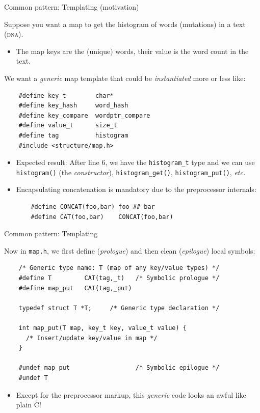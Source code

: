 \begin{frame}[fragile]{Common pattern: Templating (motivation)}

  Suppose you want a map to get the histogram of words (mutations) in a text (\textsc{dna}).
  \begin{itemize}
  \item The map keys are the (unique) words, their value is the word count in the text.
  \end{itemize}

  We want a {\em generic} map template that could be {\em instantiated} more or less like:
  \begin{lstlisting}
    #define key_t        char*
    #define key_hash     word_hash
    #define key_compare  wordptr_compare
    #define value_t      size_t
    #define tag          histogram
    #include <structure/map.h>
  \end{lstlisting}

  \begin{itemize}
  \item Expected result: After line 6, we have the \lstinline{histogram_t} type and we can use \lstinline{histogram()} (the {\em constructor}), \lstinline{histogram_get()}, \lstinline{histogram_put()}, {\em etc.}
  
  \item Encapsulating concatenation is mandatory due to the preprocessor internals:
  \begin{lstlisting}
    #define CONCAT(foo,bar) foo ## bar
    #define CAT(foo,bar)    CONCAT(foo,bar)
  \end{lstlisting}
\end{itemize}

\end{frame}

\begin{frame}[fragile]{Common pattern: Templating}

  Now in \lstinline{map.h}, we first define ({\em prologue}) and then clean ({\em epilogue}) local symbols:

  \begin{lstlisting}
    /* Generic type name: T (map of any key/value types) */
    #define T         CAT(tag,_t)   /* Symbolic prologue */
    #define map_put   CAT(tag,_put)

    typedef struct T *T;     /* Generic type declaration */

    int map_put(T map, key_t key, value_t value) {
      /* Insert/update key/value in map */
    }

    #undef map_put                  /* Symbolic epilogue */
    #undef T
  \end{lstlisting}

  \begin{itemize}
  \item Except for the preprocessor markup, this {\em generic} code looks an awful like plain C!
  \end{itemize}

\end{frame}

